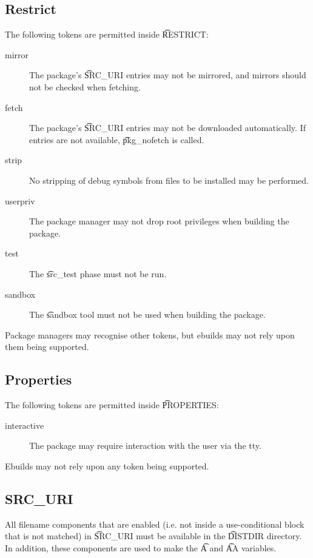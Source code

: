 \subsection{Restrict}
\label{sec:restrict}

The following tokens are permitted inside \t{RESTRICT}:

\begin{description}
\item[mirror] The package's \t{SRC\_URI} entries may not be mirrored, and mirrors should not
    be checked when fetching.
\item[fetch] The package's \t{SRC\_URI} entries may not be downloaded automatically. If
    entries are not available, \t{pkg\_nofetch} is called.
\item[strip] No stripping of debug symbols from files to be installed may be performed.
\item[userpriv] The package manager may not drop root privileges when building the package.
\item[test] The \t{src\_test} phase must not be run.
\item[sandbox] The \t{sandbox} tool must not be used when building the package.
\end{description}

Package managers may recognise other tokens, but ebuilds may not rely upon them being supported.

\subsection{Properties}
\label{sec:properties}

The following tokens are permitted inside \t{PROPERTIES}:

\begin{description}
\item[interactive] The package may require interaction with the user via the tty.
\end{description}

Ebuilds may not rely upon any token being supported.

\subsection{SRC\_URI}
\label{sec:src-uri-behaviour}

All filename components that are enabled (i.e. not inside a use-conditional block that is not
matched) in \t{SRC\_URI} must be available in the \t{DISTDIR} directory. In addition, these
components are used to make the \t{A} and \t{AA} variables.

